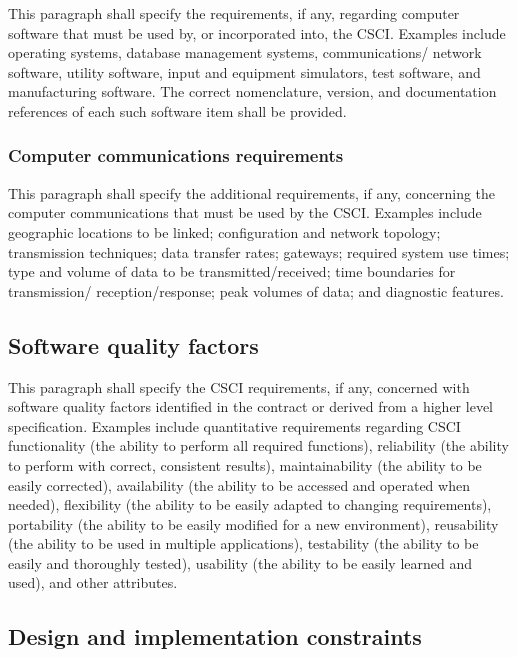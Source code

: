 \documentclass{fidata-report-template}
\begin{document}
This paragraph shall specify the requirements, if any, regarding
computer software that must be used by, or incorporated into, the CSCI.
Examples include operating systems, database management systems,
communications/ network software, utility software, input and equipment
simulators, test software, and manufacturing software. The correct
nomenclature, version, and documentation references of each such
software item shall be provided.

\subsubsection{Computer communications requirements}

This paragraph shall specify the additional requirements, if any,
concerning the computer communications that must be used by the CSCI.
Examples include geographic locations to be linked; configuration and
network topology; transmission techniques; data transfer rates;
gateways; required system use times; type and volume of data to be
transmitted/received; time boundaries for transmission/
reception/response; peak volumes of data; and diagnostic features.

\subsection{Software quality factors}

This paragraph shall specify the CSCI requirements, if any, concerned
with software quality factors identified in the contract or derived from
a higher level specification. Examples include quantitative requirements
regarding CSCI functionality (the ability to perform all required
functions), reliability (the ability to perform with correct, consistent
results), maintainability (the ability to be easily corrected),
availability (the ability to be accessed and operated when needed),
flexibility (the ability to be easily adapted to changing requirements),
portability (the ability to be easily modified for a new environment),
reusability (the ability to be used in multiple applications),
testability (the ability to be easily and thoroughly tested), usability
(the ability to be easily learned and used), and other attributes.

\subsection{Design and implementation constraints}
\end{document}
